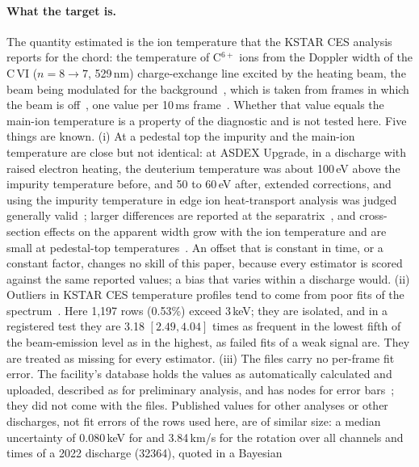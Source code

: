 \paragraph{What the target is.} The quantity estimated is the ion temperature that
the KSTAR CES analysis reports for the chord: the temperature of C$^{6+}$ ions from
the Doppler width of the C\,VI ($n = 8 \to 7$, 529\,nm) charge-exchange line excited
by the heating beam, the beam being modulated for the
background~\citep{Ko2010KstarCesSystem,Ko2010ChargeExchange}, which is taken from frames
in which the beam is off~\citep{Ko2015IonTemperature,Lee2016ValidationToroidal,KFE2026DiagnosticsDataUserGuide},
one value per 10\,ms frame~\citep{Kim2024KineticProfile}. Whether that value equals the main-ion
temperature is a property of the diagnostic and is not tested here. Five things are
known. (i) At a pedestal top the impurity and the main-ion temperature are close but
not identical: at ASDEX Upgrade, in a discharge with raised electron heating, the
deuterium temperature was about 100\,eV above the impurity temperature before, and 50 to
60\,eV after, extended corrections, and using the impurity temperature in edge ion
heat-transport analysis was judged generally valid~\citep{CanoMegias2025MultiIon};
larger differences are reported at the separatrix~\citep{Haskey2018MainIon}, and
cross-section effects on the apparent width grow with the ion temperature and are small
at pedestal-top temperatures~\citep{vonHellermann1995CrossSection}. An offset that
is constant in time, or a constant factor, changes no skill of this paper, because
every estimator is scored against the same reported values; a bias that varies within
a discharge would. (ii) Outliers in KSTAR CES temperature profiles tend to come from
poor fits of the spectrum~\citep{Kim2024KineticProfile}. Here 1{,}197 \Ti{} rows
(0.53\%) exceed 3\,keV; they are isolated, and in a registered test they are 3.18
$[2.49, 4.04]$ times as frequent in the lowest fifth of the beam-emission level as in
the highest, as failed fits of a weak signal are. They are treated as missing for
every estimator. (iii) The files carry no per-frame fit error. The facility's database
holds the values as automatically calculated and uploaded, described as for preliminary
analysis, and has nodes for error bars~\citep{KFE2026DiagnosticsDataUserGuide}; they did
not come with the files. Published
values for other analyses or other discharges, not fit errors of the rows used here, are
of similar size: a median uncertainty of 0.080\,keV for \Ti{} and 3.84\,km/s for the
rotation over all channels and times of a 2022 discharge (32364), quoted in a Bayesian
